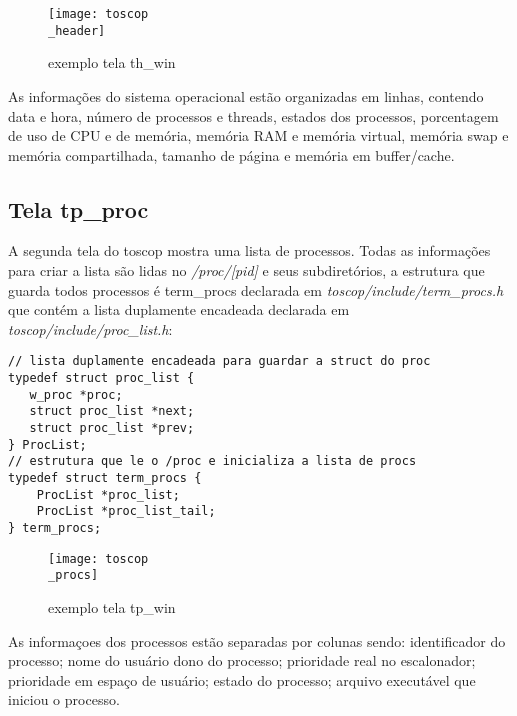 \documentclass{article}
\begin{document}
\begin{figure}[H]
    \centering
    \texttt{[image: toscop\\\_header]}
    \caption{exemplo tela th\_win}
\end{figure}
As informações do sistema operacional estão organizadas em linhas, 
contendo data e hora, número de processos e threads, estados dos processos, 
porcentagem de uso de CPU e de memória, memória RAM e memória virtual,
memória swap e memória compartilhada, tamanho de página e memória em buffer/cache.

\subsection{Tela tp\_proc}
A segunda tela do toscop mostra uma lista de processos. Todas as 
informações para criar a lista são lidas no \textit{/proc/[pid]} e seus
subdiretórios, a estrutura que guarda todos processos é term\_procs declarada
em \textit{toscop/include/term\_procs.h} que contém a lista duplamente
encadeada declarada em \textit{toscop/include/proc\_list.h}:
\begin{verbatim}
// lista duplamente encadeada para guardar a struct do proc
typedef struct proc_list {
   w_proc *proc;
   struct proc_list *next;
   struct proc_list *prev;
} ProcList;
// estrutura que le o /proc e inicializa a lista de procs
typedef struct term_procs {
    ProcList *proc_list;
    ProcList *proc_list_tail;
} term_procs;
\end{verbatim}
\begin{figure}[H]
    \centering
    \texttt{[image: toscop\\\_procs]}
    \caption{exemplo tela tp\_win}
\end{figure}
As informaçoes dos processos estão separadas por colunas sendo:
identificador do processo; nome do usuário dono do processo;
prioridade real no escalonador; prioridade em espaço de usuário;
estado do processo; arquivo executável que iniciou o processo.
\end{document}
